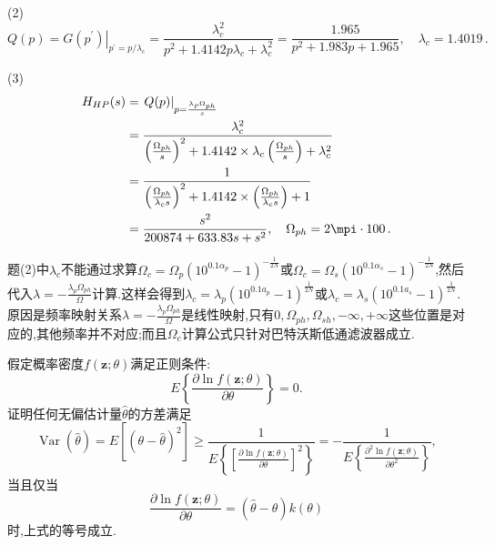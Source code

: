 \documentclass[list,answers,csize4,custom]{sysuexam}
\begin{document}
\begin{groups}
\begin{questions}[rst]
\begin{solution}
        \sj (2) $$
        Q(p)=\left.G\left(p^{\prime}\right)\right|_{p^{\prime}=p / \lambda_{c}}=\frac{\lambda_{c}^{2}}{p^{2}+1.4142 p \lambda_{c}+\lambda_{c}^{2}}=\frac{1.965}{p^{2}+1.983 p+1.965},\quad \lambda_{c}=1.4019\,.
        $$

        \sj (3)
        $$
        \begin{aligned}
        H_{H P}(s) &=\left.Q(p)\right|_{p=\frac{\lambda_{p} \Omega_{p h}}{s}}\\
        &=\frac{\lambda_{c}^{2}}{\left(\frac{\Omega_{p h}}{s}\right)^{2}+1.4142 \times \lambda_{c}\left(\frac{\Omega_{p h}}{s}\right)+\lambda_{c}^{2}}\\
        &=\frac{1}{\left(\frac{\Omega_{p h}}{\lambda_{c} s}\right)^{2}+1.4142 \times\left(\frac{\Omega_{p h}}{\lambda_{c} s}\right)+1} \\
        &=\frac{s^{2}}{200874+633.83 s+s^{2}}, \quad \Omega_{p h}=2 \mpi \cdot 100\,.
        \end{aligned}
        $$

        \remark 题(2)中$\lambda_c$不能通过求算$\Omega_c=\Omega_p(10^{0.1\alpha_p}-1)^{-\frac{1}{2N}}$或$\Omega_c=\Omega_s(10^{0.1\alpha_s}-1)^{-\frac{1}{2N}}$,然后代入$\lambda=-\frac{\lambda_{p}\Omega_{ph}}{\Omega}$计算.这样会得到$\lambda_{c}=\lambda_{p}\left(10^{0.1 a_{p}}-1\right)^{\frac{1}{2 N}}$或$\lambda_{c}=\lambda_{s}\left(10^{0.1 a_{s}}-1\right)^{\frac{1}{2 N}}$.原因是频率映射关系$\lambda=-\frac{\lambda_{p}\Omega_{ph}}{\Omega}$是线性映射,只有$0,\Omega_{ph},\Omega_{sh},-\infty,+\infty$这些位置是对应的,其他频率并不对应;而且$\Omega_c$计算公式只针对巴特沃斯低通滤波器成立.
    \end{solution}

    \question[10] 假定概率密度$f(\boldsymbol{z} ; \theta)$满足正则条件:
    $$E\left\{\frac{\partial \ln f(\boldsymbol{z} ; \theta)}{\partial \theta}\right\}=0.$$
    证明任何无偏估计量$\hat{\theta}$的方差满足
    $$\operatorname{Var}(\hat{\theta})=E\left[(\theta-\hat{\theta})^{2}\right] \geqslant \frac{1}{E\left\{\left[\frac{\partial \ln f(\boldsymbol{z} ; \theta)}{\partial \theta}\right]^{2}\right\}}=-\frac{1}{E\left\{\frac{\partial^{2} \ln f(\boldsymbol{z} ; \theta)}{\partial \theta^{2}}\right\}},$$
    当且仅当$$\frac{\partial \ln f(\boldsymbol{z} ; \theta)}{\partial \theta}=(\hat{\theta}-\theta) k(\theta)$$时,上式的等号成立.\par
    

\end{questions}
\end{groups}
\end{document}
